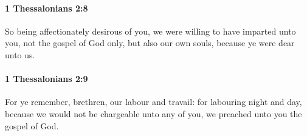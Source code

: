 		\paragraph{1 Thessalonians 2:8} %
			\label{1THESSALONIANS-2-8}

			So being affectionately desirous of you, we were willing to have imparted unto you, not the gospel of God only, but also our own souls, because ye were dear unto us.

			\begin{framed}
			\scriptsize
				\begin{compactdesc}
					\item[SBLG] 
				\end{compactdesc}
			\end{framed}

		\paragraph{1 Thessalonians 2:9} %
			\label{1THESSALONIANS-2-9}

			For ye remember, brethren, our labour and travail: for labouring night and day, because we would not be chargeable unto any of you, we preached unto you the gospel of God.


